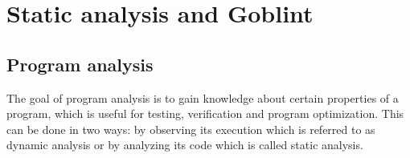 


\chapter{Static analysis and Goblint} %
\section{Program analysis}
The goal of program analysis is to gain knowledge about certain properties of a program, which is useful for testing, verification and program optimization.
This can be done in two ways: by observing its execution which is referred to as dynamic analysis or by analyzing its code which is called static analysis.


